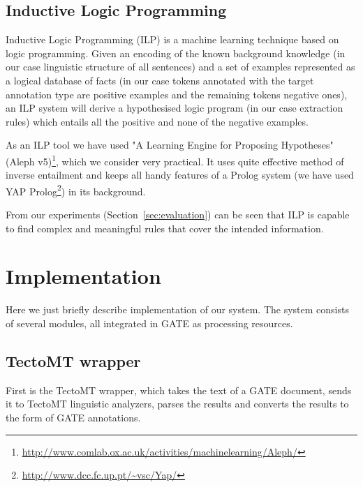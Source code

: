\documentclass[runningheads,a4paper]{llncs}
\begin{document}



\subsection{Inductive Logic Programming}
Inductive Logic Programming (ILP) \cite{dedek:MuggletonILP} is a machine learning technique based on logic programming. Given an encoding of the known background knowledge (in our case linguistic structure of all sentences) and a set of examples represented as a logical database of facts (in our case tokens annotated with the target annotation type are positive examples and the remaining tokens negative ones), an ILP system will derive a hypothesised logic program (in our case extraction rules) which entails all the positive and none of the negative examples.

As an ILP tool we have used "A Learning Engine for Proposing Hypotheses" (Aleph v5)\footnote{\url{http://www.comlab.ox.ac.uk/activities/machinelearning/Aleph/}}, which we consider very practical. It uses quite effective method of inverse entailment \cite{biblio:InverseEntailment} and keeps all handy features of a Prolog system (we have used YAP Prolog\footnote{\url{http://www.dcc.fc.up.pt/~vsc/Yap/}}) in its background.


From our experiments (Section~\ref{sec:evaluation}) can be seen that ILP is capable to find complex and meaningful rules that cover the intended information.

%





\section{Implementation}
Here we just briefly describe implementation of our system. The system consists of several modules, all integrated in GATE as processing resources.

\subsection{TectoMT wrapper}
First is the TectoMT wrapper, which takes the text of a GATE document, sends it to TectoMT linguistic analyzers, parses the results and converts the results to the form of GATE annotations.
\end{document}
